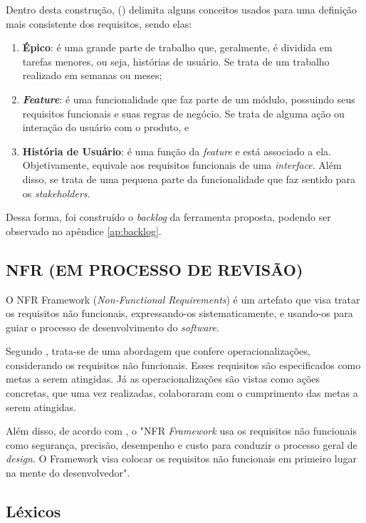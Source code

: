 Dentro desta construção,  (\citeyear{carolipaulo2021}) delimita alguns conceitos usados para uma definição mais consistente dos requisitos, sendo elas:

\begin{enumerate}
    \item \textbf{Épico}: é uma grande parte de trabalho que, geralmente, é dividida em tarefas menores, ou seja, histórias de usuário. Se trata de um trabalho realizado em semanas ou meses;
    \item \textit{\textbf{Feature}}: é uma funcionalidade que faz parte de um módulo, possuindo seus requisitos funcionais e suas regras de negócio. Se trata de alguma ação ou interação do usuário com o produto, e
    \item \textbf{História de Usuário}: é uma função da \textit{feature} e está associado a ela. Objetivamente, equivale aos requisitos funcionais de uma \textit{interface}. Além disso, se trata de uma pequena parte da funcionalidade que faz sentido para os \textit{stakeholders}.
\end{enumerate}

Dessa forma, foi construído o \textit{backlog} da ferramenta proposta, podendo ser observado no apêndice \ref{ap:backlog}.

\subsection{NFR (EM PROCESSO DE REVISÃO)}
O NFR Framework (\textit{Non-Functional Requirements}) é um artefato que visa tratar os requisitos não funcionais, expressando-os sistematicamente, e usando-os para guiar o processo de desenvolvimento do \textit{software}.

Segundo \cite{coutoproposta}, trata-se de uma abordagem que confere operacionalizações, considerando os requisitos não funcionais. Esses requisitos são especificados como metas a serem atingidas. Já as operacionalizações são vistas como ações concretas, que uma vez realizadas, colaboraram com o cumprimento das metas a serem atingidas.

Além disso, de acordo com \cite{chung2012non}, o "NFR \textit{Framework} usa os requisitos não funcionais como segurança, precisão, desempenho e custo para conduzir o processo geral de \textit{design}. O Framework visa colocar os requisitos não funcionais em primeiro lugar na mente do desenvolvedor".

\subsection{Léxicos}

